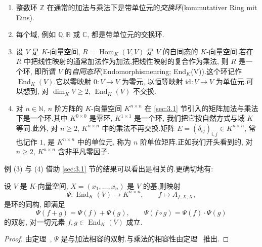 \begin{enumerate}
\item 整数环 $\mathbb{Z}$ 在通常的加法与乘法下是带单位元的\emph{交换环}(\textup{kommutativer Ring mit Eins}).
\item 每个域, 例如 $\mathbb{Q}, \mathbb{R}$ 或 $\mathbb{C}$, 都是带单位元的交换环.
\item 设 $V$ 是 $K$-向量空间, $R = \operatorname{Hom}_K(V, V)$ 是 $V$ 的自同态的 $K$-向量空间.若在 $R$ 中把线性映射的通常加法作为加法,把线性映射的复合作为乘法, 则 $R$ 是一个环, 即所谓 $V$ 的\emph{自同态环}(\textup{Endomorphismenring; End$_K$(V)}).这个环记作 $\operatorname{End}_K(V)$.它以零映射 $0 \colon V \longrightarrow V$ 为零元, 以恒等映射 $\mathrm{id} \colon V \longrightarrow V$ 为单位元.可以想到, 对 $\dim_K V \geq 2$, $\operatorname{End}_K(V)$ 不交换.
\item 对 $n \in \mathbb{N}$, $n$ 阶方阵的 $K$-向量空间 $K^{n \times n}$ 在 \ref{sec:3.1} 节引入的矩阵加法与乘法下是一个环.其中 $K^{0 \times 0}$ 是零环, $K^{1 \times 1}$ 是一个环, 我们把它按自然方式与域 $K$ 等同.此外, 对 $n \geq 2$, $K^{n \times n}$ 中的乘法不再交换.矩阵 $E = (\delta_{ij})_{i, j} \in K^{n \times n}$, 常也记作 $1$, 是 $K^{n \times n}$ 中的单位元, 称为 $n$ 阶单位矩阵.正如我们开头看到的, 对 $n \geq 2$, $K^{n \times n}$ 含非平凡零因子.
\end{enumerate}

例 (3) 与 (4) 借助 \ref{sec:3.1} 节的结果可以看出是相关的.更确切地有:

\begin{theorem}\label{thm:3.3.2}
设 $V$ 是 $K$-向量空间, $X = (x_1, \ldots, x_n)$ 是 $V$ 的基.则映射
\[
\varPsi \colon \operatorname{End}_K(V) \longrightarrow K^{n \times n}, \qquad f \longmapsto A_{f, X, X},
\]
是环的同构, 即满足
\[
\varPsi(f + g) = \varPsi(f) + \varPsi(g), \qquad \varPsi(f \circ g) = \varPsi(f) \cdot \varPsi(g)
\]
的双射, 对一切元素 $f, g \in \operatorname{End}_K(V)$ 成立.
\end{theorem}

\begin{proof}
由定理~, $\varPsi$ 是与加法相容的双射.与乘法的相容性由定理~ 推出.
\end{proof}


